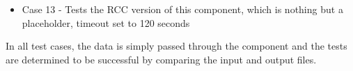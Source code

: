 \begin{flushleft}
\begin{itemize}
\item Case 13 - Tests the RCC version of this component, which is nothing but a placeholder, timeout set to 120 seconds
\end{itemize}

In all test cases, the data is simply passed through the component and the tests are determined to be successful by comparing the input and output files.

\end{flushleft}

